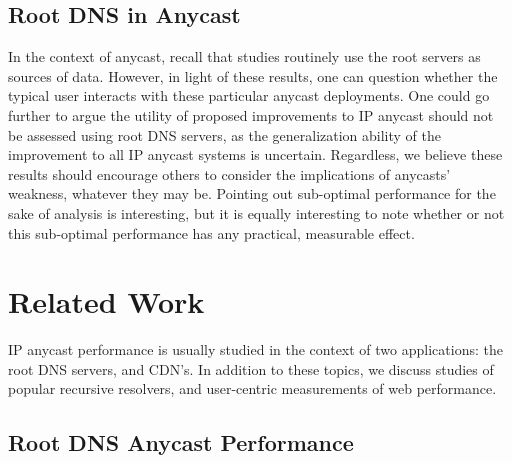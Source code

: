\documentclass[sigconf,nonacm,10pt]{acmart}
\begin{document}
\subsection{Root DNS in Anycast}\label{root-dns-in-anycast}

\label{sec:discussion_implications} In the context of anycast, recall
that studies routinely use the root servers as sources of data. However,
in light of these results, one can question whether the typical user
interacts with these particular anycast deployments. One could go
further to argue the utility of proposed improvements to IP anycast
should not be assessed using root DNS servers, as the generalization
ability of the improvement to all IP anycast systems is uncertain.
\break
Regardless, we believe these results should encourage others to consider
the implications of anycasts' weakness, whatever they may be. Pointing
out sub-optimal performance for the sake of analysis is interesting, but
it is equally interesting to note whether or not this sub-optimal
performance has any practical, measurable effect.

\section{Related Work}\label{related-work-1}

\label{sec:related} IP anycast performance is usually studied in the
context of two applications: the root DNS servers, and CDN's. In
addition to these topics, we discuss studies of popular recursive
resolvers, and user-centric measurements of web performance.

\subsection{Root DNS Anycast
Performance}\label{root-dns-anycast-performance}
\end{document}
